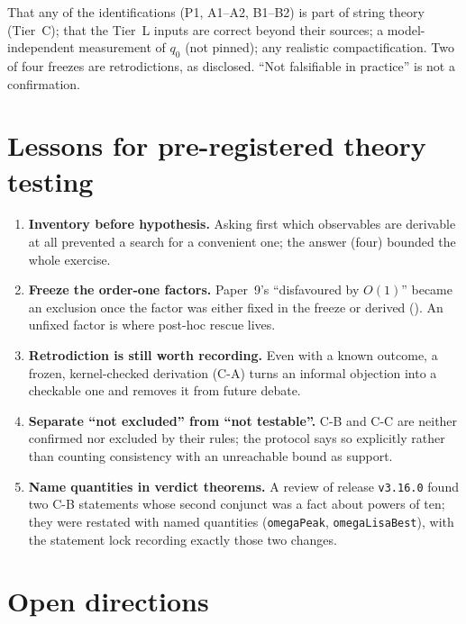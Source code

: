 \documentclass[11pt,a4paper]{article}
\theoremstyle{remark}
\newcommand{\lean}[1]{\texttt{#1}}
\begin{document}
\begin{scopebox}
That any of the identifications (P1, A1--A2, B1--B2) is part of string theory (Tier~C); that the Tier~L inputs are
correct beyond their sources; a model-independent measurement of $q_0$ (not pinned); any realistic compactification.
Two of four freezes are retrodictions, as disclosed. ``Not falsifiable in practice'' is not a confirmation.
\end{scopebox}

\section{Lessons for pre-registered theory testing}
\label{sec:lessons}

\begin{enumerate}
\item \textbf{Inventory before hypothesis.} Asking first which observables are derivable at all prevented a search
  for a convenient one; the answer (four) bounded the whole exercise.
\item \textbf{Freeze the order-one factors.} Paper~9's ``disfavoured by $O(1)$'' became an exclusion once the factor was
  either fixed in the freeze or derived (). An unfixed factor is where post-hoc rescue lives.
\item \textbf{Retrodiction is still worth recording.} Even with a known outcome, a frozen, kernel-checked derivation
  (C-A) turns an informal objection into a checkable one and removes it from future debate.
\item \textbf{Separate ``not excluded'' from ``not testable''.} C-B and C-C are neither confirmed nor excluded by
  their rules; the protocol says so explicitly rather than counting consistency with an unreachable bound as
  support.
\item \textbf{Name quantities in verdict theorems.} A review of release \texttt{v3.16.0} found two C-B statements whose
  second conjunct was a fact about powers of ten; they were restated with named quantities (\lean{omegaPeak},
  \lean{omegaLisaBest}), with the statement lock recording exactly those two changes.
\end{enumerate}

\section{Open directions}
\label{sec:open}
\end{document}
